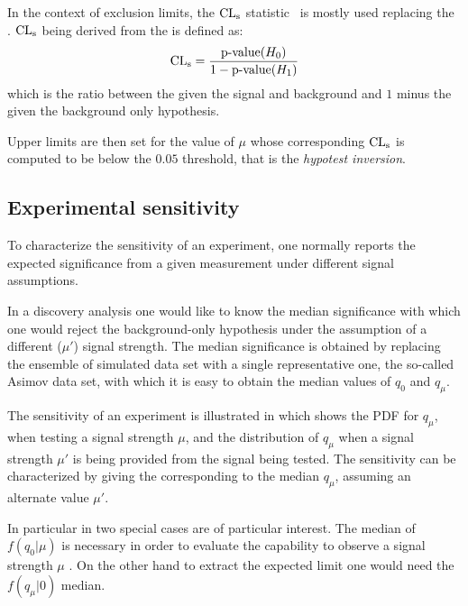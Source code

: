 In the context of exclusion limits, the $\text{CL}_\textup{s}$ statistic~\cite{Read:451614} is mostly used replacing the \p. $\text{CL}_\textup{s}$ being derived from the \p is defined as:
\begin{equation}
	\text{CL}_\textup{s}=\frac{\text{p-value}(H_0)}{1-\text{p-value}(H_1)}
\end{equation}
which is the ratio between the \p given the signal and background and $1$ minus the \p given the background only hypothesis.

Upper limits are then set for the value of $\mu$ whose corresponding $\text{CL}_\textup{s}$ is computed to be below the $0.05$ threshold, that is the \emph{hypotest inversion}.

\subsection{Experimental sensitivity}
\label{sec:sensitivity}
To characterize the sensitivity of an experiment, one normally reports the expected significance from a given measurement under different signal assumptions.


In a discovery analysis one would like to know the median significance with which one would reject the background-only hypothesis under the assumption of a different ($\mu'$) signal strength. The median significance is obtained by replacing the ensemble of simulated data set with a single representative one, the so-called Asimov data set, with which it is easy to obtain the median values of $q_0$ and $q_\mu$.

The sensitivity of an experiment is illustrated in \Fig{\ref{fig:medianq}} which shows the PDF for $q_\mu$, when testing a signal strength $\mu$, and the distribution of $q_\mu$ when a signal strength $\mu'$ is being provided from the signal being tested. The sensitivity can be characterized by giving the \p corresponding to the median $q_\mu$, assuming an alternate value $\mu'$. 

In particular in two special cases are of particular interest. The median of $f(q_0 \vert \mu)$ is necessary in order to evaluate the capability to observe a signal strength $\mu$ . On the other hand to extract the expected limit one would need the $f(q_\mu \vert 0)$ median.


